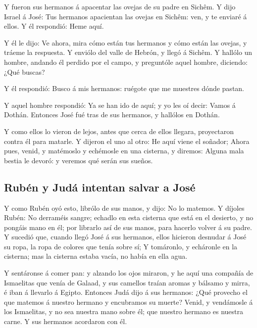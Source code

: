  Y fueron sus hermanos á apacentar las ovejas de su padre
en Sichêm.  Y dijo Israel á José: Tus hermanos apacientan
las ovejas en Sichêm: ven, y te enviaré á ellos. Y él respondió: Heme
aquí.

 Y él le dijo: Ve ahora, mira cómo están tus hermanos y
cómo están las ovejas, y tráeme la respuesta. Y enviólo del valle de
Hebrón, y llegó á Sichêm.  Y hallólo un hombre, andando
él perdido por el campo, y preguntóle aquel hombre, diciendo: ¿Qué
buscas?

 Y él respondió: Busco á mis hermanos: ruégote que me
muestres dónde pastan.

 Y aquel hombre respondió: Ya se han ido de aquí; y yo
les oí decir: Vamos á Dothán. Entonces José fué tras de sus hermanos, y
hallólos en Dothán.

 Y como ellos lo vieron de lejos, antes que cerca de
ellos llegara, proyectaron contra él para matarle.  Y
dijeron el uno al otro: He aquí viene el soñador;  Ahora
pues, venid, y matémoslo y echémosle en una cisterna, y diremos: Alguna
mala bestia le devoró: y veremos qué serán sus sueños.

\hypertarget{rubuxe9n-y-juduxe1-intentan-salvar-a-josuxe9}{%
\subsection{Rubén y Judá intentan salvar a
José}\label{rubuxe9n-y-juduxe1-intentan-salvar-a-josuxe9}}

 Y como Rubén oyó esto, librólo de sus manos, y dijo: No
lo matemos.  Y díjoles Rubén: No derraméis sangre;
echadlo en esta cisterna que está en el desierto, y no pongáis mano en
él; por librarlo así de sus manos, para hacerlo volver á su padre.
 Y sucedió que, cuando llegó José á sus hermanos, ellos
hicieron desnudar á José su ropa, la ropa de colores que tenía sobre sí;
 Y tomáronlo, y echáronle en la cisterna; mas la cisterna
estaba vacía, no había en ella agua.

 Y sentáronse á comer pan: y alzando los ojos miraron, y
he aquí una compañía de Ismaelitas que venía de Galaad, y sus camellos
traían aromas y bálsamo y mirra, é iban á llevarlo á Egipto.
 Entonces Judá dijo á sus hermanos: ¿Qué provecho el que
matemos á nuestro hermano y encubramos su muerte?  Venid,
y vendámosle á los Ismaelitas, y no sea nuestra mano sobre él; que
nuestro hermano es nuestra carne. Y sus hermanos acordaron con él.

